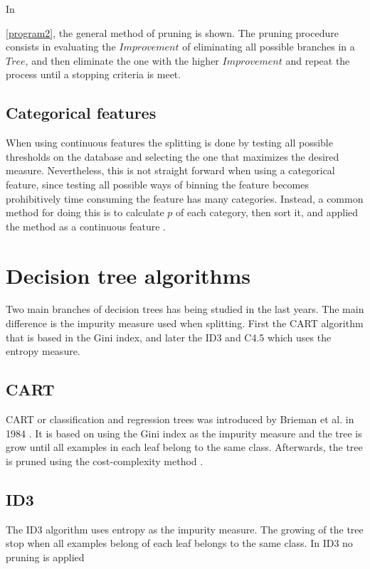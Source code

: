 {  
  
  
   In \figurename{ \ref{program2}, the general method of pruning is shown. The pruning procedure 
consists in
  evaluating the $Improvement$ of eliminating all possible branches in a $Tree$, and then eliminate 
the one
  with the higher $Improvement$ and repeat the process until a stopping criteria is meet.

 
  \subsection{Categorical features}
  When using continuous features the splitting is done by testing all possible thresholds on the 
database and
  selecting the one that maximizes the desired measure. Nevertheless, this is not straight forward 
when using a
  categorical feature, since testing all possible ways of binning the feature becomes prohibitively 
time 
  consuming the feature has many categories. Instead, a common method for doing this is to calculate
  $p$ of each category, then sort it, and applied the method as a continuous feature 
\citep{Marslan}.
 
  \section{Decision tree algorithms}
  Two main branches of decision trees has being studied in the last years. The main difference is 
the
  impurity measure used when splitting. First the CART algorithm that is based in the Gini index, 
and
  later the ID3 and C4.5 which uses the entropy measure.
  
  \subsection{CART}
  CART or classification and regression trees was introduced by Brieman et al. in 1984 
\citep{Breiman1984a}.
  It is based on using the Gini index as the impurity measure and the tree is grow until all 
examples in
  each leaf belong to the same class. Afterwards, the tree is pruned using the cost-complexity
  method \citep{Rokach2010,Marslan}.
  
  \subsection{ID3}
  The ID3 algorithm uses entropy as the impurity measure. The growing of the tree stop when all 
examples belong 
  of each leaf belongs to the same class. In ID3 no pruning is applied \citep{Quinlan1992}
}}
